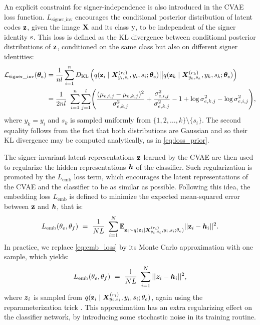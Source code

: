 An explicit constraint for signer-independence is also introduced in the CVAE loss function. $L_{\text{signer\_inv}}$ encourages the conditional posterior distribution of latent codes ${\mathbf{z}}$, given the image ${\mathbf{X}}$ and its class ${\textnormal{y}}$, to be independent of the signer identity ${\textnormal{s}}$. This loss is defined as the KL divergence between conditional posterior distributions of ${\mathbf{z}}$, conditioned on the same class but also on different signer identities:
\begin{align}
    \label{eq:loss_signer_inv}
    \mathcal{L}_{\text{signer\_inv}}({\bm{\theta}}_{e}) &= \frac{1}{nl} \sum_{i=1}^{n}D_{\mathrm{KL}}\left(q({\mathbf{z}}_{i} \mid {\bm{X}}^{(r_{i})}_{y_{i},s_{i}}, y_{i}, s_{i}; {\bm{\theta}}_e) \big| \big| q({\mathbf{z}}_{k} \mid {\bm{X}}^{(r_{k})}_{y_{k},s_{k}}, y_{k}, s_{k}; {\bm{\theta}}_e)\right) \nonumber\\
    &=\frac{1}{2nl}~\sum_{i=1}^{n}\sum_{j=1}^{l} \Biggl(\frac{(\mu_{e,i,j} - \mu_{e,k,j})^2}{\sigma_{e,k,j}^2} + \frac{\sigma_{e,i,j}^2}{\sigma_{e,k,j}^2} -1 + \log \sigma_{e,k,j}^2 - \log \sigma_{e,i,j}^2 \Biggr),
\end{align}
where $y_{k}=y_{i}$ and $s_k$ is sampled uniformly from $\{1,2,\dots,k\} \setminus \lbrace s_i \rbrace$. The second equality follows from the fact that both distributions are Gaussian and so their KL divergence may be computed analytically, as in \eqref{eq:loss_prior}.

The signer-invariant latent representations ${\mathbf{z}}$ learned by the CVAE are then used to regularize the hidden representations ${\bm{h}}$ of the classifier. Such regularization is promoted by the $L_{\text{emb}}$ loss term, which encourages the latent representations of the CVAE and the classifier to be as similar as possible. Following this idea, the embedding loss $L_{\text{emb}}$ is defined to minimize the expected mean-squared error between ${\mathbf{z}}$ and ${\bm{h}}$, that is:
\begin{equation}
    \label{eq:emb_loss}
    L_{\text{emb}}(\theta_e, \theta_f)~=~\frac{1}{NL}~\sum_{i=1}^{N}\mathbb{E}_{{\mathbf{z}}_{i} \sim q({\mathbf{z}}_{i} \mid {\bm{X}}^{(r_{i})}_{y_{i},s_{i}}, y_{i}, s_{i}; \theta_e)}||{\mathbf{z}}_i-{\bm{h}}_i||^2.
\end{equation}
In practice, we replace \eqref{eq:emb_loss} by its Monte Carlo approximation with one sample, which yields:
\begin{equation}
    L_{\text{emb}}(\theta_e, \theta_f)~=~\frac{1}{NL}~\sum_{i=1}^{N}||{\bm{z}}_i-{\bm{h}}_i||^2,
\end{equation}
where ${\bm{z}}_i$ is sampled from $q({\mathbf{z}}_{i} \mid {\bm{X}}^{(r_{i})}_{y_{i},s_{i}}, y_{i}, s_{i}; \theta_e)$, again using the reparameterization trick . This approximation has an extra regularizing effect on the classifier network, by introducing some stochastic noise in its training routine.


